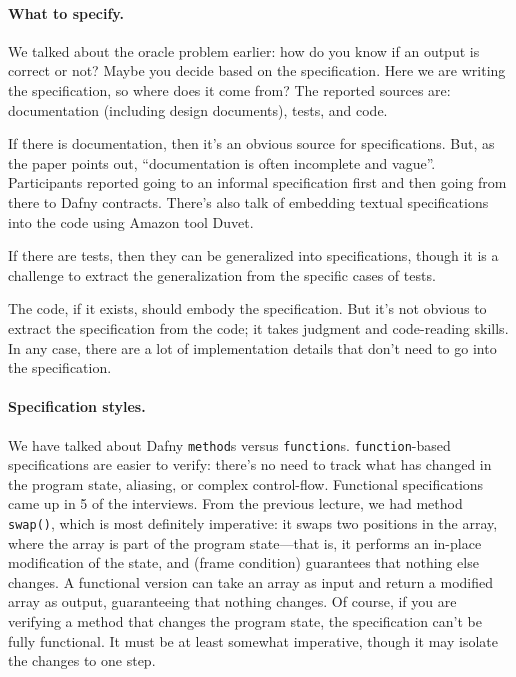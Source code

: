 \documentclass[11pt]{article}
\begin{document}
\paragraph{What to specify.} We talked about the oracle problem earlier: how do you know if an output
is correct or not? Maybe you decide based on the specification. Here we are writing the specification,
so where does it come from? The reported sources are: documentation (including design documents), tests, and code.

If there is documentation, then it's an obvious source for specifications. But, as the paper points out,
``documentation is often incomplete and vague''. Participants reported going to an informal specification first
and then going from there to Dafny contracts. There's also talk of embedding textual specifications into the code
using Amazon tool Duvet.

If there are tests, then they can be generalized into specifications, though it is a challenge to extract
the generalization from the specific cases of tests.

The code, if it exists, should embody the specification. But it's not obvious to extract the specification
from the code; it takes judgment and code-reading skills. In any case, there are a lot of implementation
details that don't need to go into the specification.

\paragraph{Specification styles.} We have talked about Dafny \texttt{method}s versus \texttt{function}s.
\texttt{function}-based specifications are easier to verify: there's no need to track what has changed
in the program state, aliasing, or complex control-flow. Functional specifications came up in 5 of the interviews.
From the previous lecture, we had method \texttt{swap()}, which is most definitely imperative:
it swaps two positions in the array, where the array is part of the program state---that is, it performs
an in-place modification of the state, and (frame condition) guarantees that nothing else changes. A functional version
can take an array as input and return a modified array as output, guaranteeing that nothing changes.
Of course, if you are verifying a method that changes the program state, the specification can't be fully functional.
It must be at least somewhat imperative, though it may isolate the changes to one step.
\end{document}
